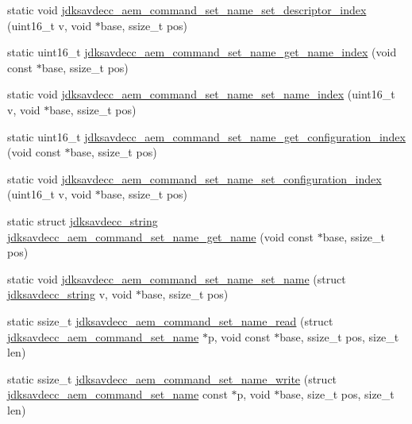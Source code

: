 \begin{DoxyCompactItemize}
\item 
static void \hyperlink{group__command__set__name_gae69dab05aea66a2e94c696b71f16057e}{jdksavdecc\+\_\+aem\+\_\+command\+\_\+set\+\_\+name\+\_\+set\+\_\+descriptor\+\_\+index} (uint16\+\_\+t v, void $\ast$base, ssize\+\_\+t pos)
\item 
static uint16\+\_\+t \hyperlink{group__command__set__name_gaff73dfa5ea5a6a960dd05630e378f59f}{jdksavdecc\+\_\+aem\+\_\+command\+\_\+set\+\_\+name\+\_\+get\+\_\+name\+\_\+index} (void const $\ast$base, ssize\+\_\+t pos)
\item 
static void \hyperlink{group__command__set__name_gab5febf3333365832904e47914efe1549}{jdksavdecc\+\_\+aem\+\_\+command\+\_\+set\+\_\+name\+\_\+set\+\_\+name\+\_\+index} (uint16\+\_\+t v, void $\ast$base, ssize\+\_\+t pos)
\item 
static uint16\+\_\+t \hyperlink{group__command__set__name_gaca021112f6fa80ed6ee671090c0420a2}{jdksavdecc\+\_\+aem\+\_\+command\+\_\+set\+\_\+name\+\_\+get\+\_\+configuration\+\_\+index} (void const $\ast$base, ssize\+\_\+t pos)
\item 
static void \hyperlink{group__command__set__name_gab5e43bf973b2f00bd6d5f7cf6b0736dd}{jdksavdecc\+\_\+aem\+\_\+command\+\_\+set\+\_\+name\+\_\+set\+\_\+configuration\+\_\+index} (uint16\+\_\+t v, void $\ast$base, ssize\+\_\+t pos)
\item 
static struct \hyperlink{structjdksavdecc__string}{jdksavdecc\+\_\+string} \hyperlink{group__command__set__name_ga61bde5eefbc433ef4bea0bae27bfd71e}{jdksavdecc\+\_\+aem\+\_\+command\+\_\+set\+\_\+name\+\_\+get\+\_\+name} (void const $\ast$base, ssize\+\_\+t pos)
\item 
static void \hyperlink{group__command__set__name_ga49b59c695339c3f6e2fcc1f83d6e410f}{jdksavdecc\+\_\+aem\+\_\+command\+\_\+set\+\_\+name\+\_\+set\+\_\+name} (struct \hyperlink{structjdksavdecc__string}{jdksavdecc\+\_\+string} v, void $\ast$base, ssize\+\_\+t pos)
\item 
static ssize\+\_\+t \hyperlink{group__command__set__name_ga712fd243d323d78d092dc2c8d6f26c60}{jdksavdecc\+\_\+aem\+\_\+command\+\_\+set\+\_\+name\+\_\+read} (struct \hyperlink{structjdksavdecc__aem__command__set__name}{jdksavdecc\+\_\+aem\+\_\+command\+\_\+set\+\_\+name} $\ast$p, void const $\ast$base, ssize\+\_\+t pos, size\+\_\+t len)
\item 
static ssize\+\_\+t \hyperlink{group__command__set__name_ga42e5da3685796fb973c5824f960eed2e}{jdksavdecc\+\_\+aem\+\_\+command\+\_\+set\+\_\+name\+\_\+write} (struct \hyperlink{structjdksavdecc__aem__command__set__name}{jdksavdecc\+\_\+aem\+\_\+command\+\_\+set\+\_\+name} const $\ast$p, void $\ast$base, size\+\_\+t pos, size\+\_\+t len)
\end{DoxyCompactItemize}


